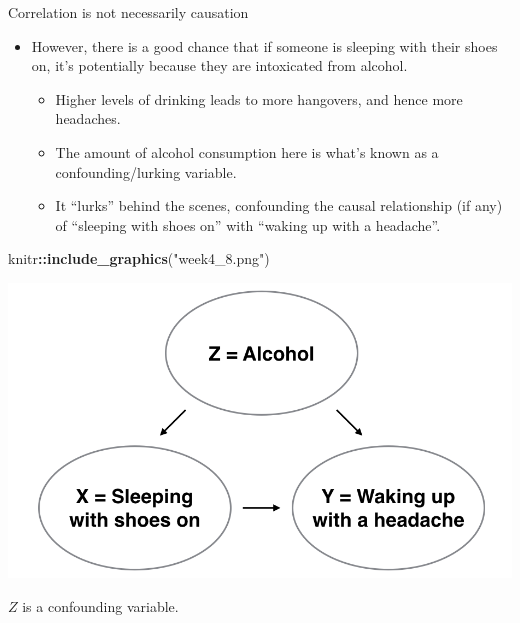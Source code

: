 \documentclass[
  ignorenonframetext,
]{beamer}
\newenvironment{Shaded}{\begin{snugshade}}{\end{snugshade}}
\newcommand{\FunctionTok}[1]{\textcolor[rgb]{0.13,0.29,0.53}{\textbf{#1}}}
\newcommand{\NormalTok}[1]{#1}
\newcommand{\SpecialCharTok}[1]{\textcolor[rgb]{0.81,0.36,0.00}{\textbf{#1}}}
\newcommand{\StringTok}[1]{\textcolor[rgb]{0.31,0.60,0.02}{#1}}
\providecommand{\tightlist}{%
  \setlength{\itemsep}{0pt}\setlength{\parskip}{0pt}}
\begin{document}
\begin{frame}[fragile]{Correlation is not necessarily causation}
\protect\hypertarget{correlation-is-not-necessarily-causation-2}{}
\begin{itemize}
\item
  However, there is a good chance that if someone is sleeping with their
  shoes on, it's potentially because they are intoxicated from alcohol.

  \begin{itemize}
  \tightlist
  \item
    Higher levels of drinking leads to more hangovers, and hence more
    headaches.
  \item
    The amount of alcohol consumption here is what's known as a
    confounding/lurking variable.
  \item
    It ``lurks'' behind the scenes, confounding the causal relationship
    (if any) of ``sleeping with shoes on'' with ``waking up with a
    headache''.
  \end{itemize}
\end{itemize}

\begin{Shaded}
\begin{Highlighting}[]
\NormalTok{knitr}\SpecialCharTok{::}\FunctionTok{include\_graphics}\NormalTok{(}\StringTok{"week4\_8.png"}\NormalTok{)}
\end{Highlighting}
\end{Shaded}

\begin{center}\includegraphics[width=0.6\linewidth,height=0.3\textheight]{week4_8} \end{center}

\(Z\) is a confounding variable.
\end{frame}
\end{document}
